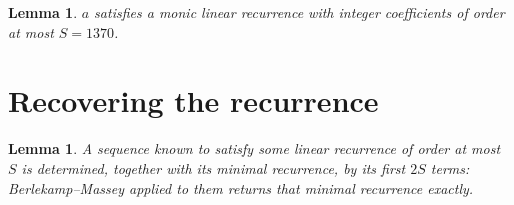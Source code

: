 \documentclass[11pt,a4paper]{article}
\theoremstyle{plain}
\newtheorem{lemma}[theorem]{Lemma}
\theoremstyle{definition}
\begin{document}
\begin{lemma}\label{lem:cf}
$a$ satisfies a monic linear recurrence with integer coefficients of order at most $S=1370$.
\end{lemma}

\section{Recovering the recurrence}

\begin{lemma}\label{lem:bm}
A sequence known to satisfy some linear recurrence of order at most $S$ is determined, together
with its minimal recurrence, by its first $2S$ terms: Berlekamp--Massey applied to them returns
that minimal recurrence exactly.
\end{lemma}
\end{document}
